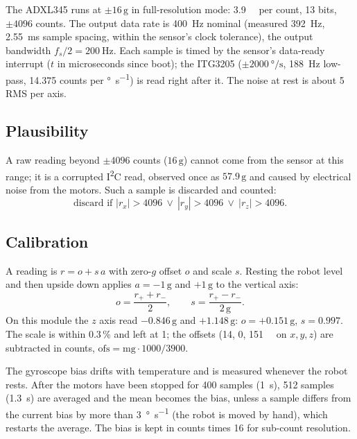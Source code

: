 \documentclass[11pt,a4paper]{article}
\newcommand{\g}{\,\mathrm{g}}
\newcommand{\gu}{\mathrm{g}}
\begin{document}
The ADXL345 runs at $\pm16\g$ in full-resolution mode: \SI{3.9}{\milli\gu} per count, 13 bits,
$\pm4096$ counts. The output data rate is \SI{400}{\hertz} nominal (measured \SI{392}{\hertz},
\SI{2.55}{\milli\second} sample spacing, within the sensor's clock tolerance), the output
bandwidth $f_s/2 = \SI{200}{\hertz}$. Each sample is timed by the sensor's data-ready interrupt
($t$ in microseconds since boot); the ITG3205 ($\pm\SI{2000}{\degree\per\second}$,
\SI{188}{\hertz} low-pass, 14.375 counts per \si{\degree\per\second}) is read right after it. The
noise at rest is about \SI{5}{\milli\gu} RMS per axis.

\subsection{Plausibility}

A raw reading beyond $\pm4096$ counts ($16\g$) cannot come from the sensor at this range; it is
a corrupted I\textsuperscript{2}C read, observed once as $57.9\g$ and caused by electrical noise
from the motors. Such a sample is discarded and counted:
\begin{equation}
  \text{discard if } |r_x| > 4096 \ \lor\ |r_y| > 4096 \ \lor\ |r_z| > 4096 .
\end{equation}

\subsection{Calibration}

A reading is $r = o + s\,a$ with zero-$g$ offset $o$ and scale $s$. Resting the robot level and
then upside down applies $a = -1\g$ and $+1\g$ to the vertical axis:
\begin{equation}
  o = \frac{r_+ + r_-}{2}, \qquad s = \frac{r_+ - r_-}{2\g} .
\end{equation}
On this module the $z$ axis read $-0.846\g$ and $+1.148\g$: $o = +0.151\g$, $s = 0.997$. The
scale is within 0.3\,\% and left at 1; the offsets (\SI{14}{}, \SI{0}{}, \SI{151}{\milli\gu} on
$x, y, z$) are subtracted in counts, $\text{ofs} = \text{mg} \cdot 1000 / 3900$.

The gyroscope bias drifts with temperature and is measured whenever the robot rests. After the
motors have been stopped for 400 samples (\SI{1}{\second}), 512 samples (\SI{1.3}{\second}) are
averaged and the mean becomes the bias, unless a sample differs from the current bias by more
than \SI{3}{\degree\per\second} (the robot is moved by hand), which restarts the average. The
bias is kept in counts times 16 for sub-count resolution.
\end{document}
